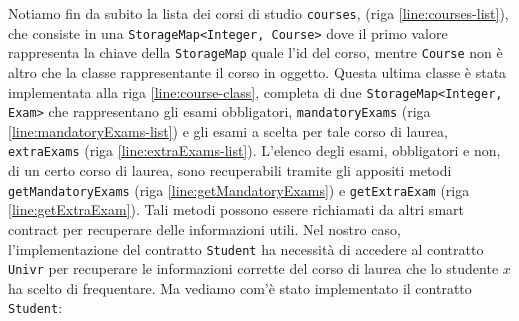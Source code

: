 %
Notiamo fin da subito la lista dei corsi di studio \lstinline|courses|, (riga \ref{line:courses-list}), che consiste in una \lstinline|StorageMap<Integer, Course>| dove il primo valore rappresenta la chiave della \lstinline|StorageMap| quale l'id del corso, mentre \lstinline|Course| non è altro che la classe rappresentante il corso in oggetto. Questa ultima classe è stata implementata alla riga \ref{line:course-class}, completa di due \lstinline|StorageMap<Integer, Exam>| che rappresentano gli esami obbligatori, \lstinline|mandatoryExams| (riga \ref{line:mandatoryExams-list}) e gli esami a scelta per tale corso di laurea, \lstinline|extraExams| (riga \ref{line:extraExams-list}). L'elenco degli esami, obbligatori e non, di un certo corso di laurea, sono recuperabili tramite gli appositi metodi \lstinline|getMandatoryExams| (riga \ref{line:getMandatoryExams}) e \lstinline|getExtraExam| (riga \ref{line:getExtraExam}). Tali metodi possono essere richiamati da altri smart contract per recuperare delle informazioni utili. Nel nostro caso, l'implementazione del contratto \lstinline|Student| ha necessità di accedere al contratto \lstinline|Univr| per recuperare le informazioni corrette del corso di laurea che lo studente $x$ ha scelto di frequentare. Ma vediamo com'è stato implementato il contratto \lstinline|Student|:
%
